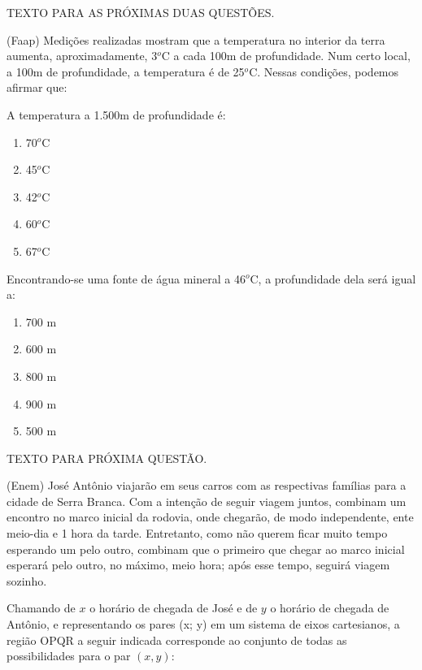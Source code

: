				\begin{center}
				\uppercase{Texto para as próximas duas questões.}
				\end{center}
				(Faap) Medições realizadas mostram que a temperatura no interior da terra aumenta, 
aproximadamente, 3$^o$C a cada 100m de profundidade. Num certo local, a 100m de profundidade, a temperatura é de 25$^o$C. Nessas condições, podemos afirmar que:
				\item A temperatura a 1.500m de profundidade é:
				\begin{multicols}{5}
				\begin{enumerate}
					\item 70$^o$C
					\item 45$^o$C
					\item 42$^o$C
					\item 60$^o$C
					\item 67$^o$C
				\end{enumerate}
				\end{multicols}
				
				\item Encontrando-se uma fonte de água mineral a 46$^o$C, a profundidade dela será igual a:
				\begin{multicols}{5}
				\begin{enumerate}
					\item 700 m				
					\item 600 m
					\item 800 m
					\item 900 m
					\item 500 m
				\end{enumerate}								
				\end{multicols}
				
				\begin{center}
					\uppercase{texto para próxima questão.}
				\end{center}				
				(Enem) José Antônio viajarão em seus carros com as respectivas famílias para a cidade de Serra Branca. Com a intenção de seguir viagem juntos, combinam um encontro no marco inicial da rodovia, onde chegarão, de modo independente, ente meio-dia e 1 hora da tarde. Entretanto, como não querem ficar muito tempo esperando um pelo outro, combinam que o primeiro que chegar ao marco inicial esperará pelo outro, no máximo, meio hora; após esse tempo, seguirá viagem sozinho.		
				\item Chamando de $x$ o horário de chegada de José e de $y$ o horário de chegada de Antônio, e representando os pares (x; y) em um sistema de eixos cartesianos, a região OPQR a seguir indicada corresponde ao conjunto de todas as possibilidades para o par $(x, y)$:
				
